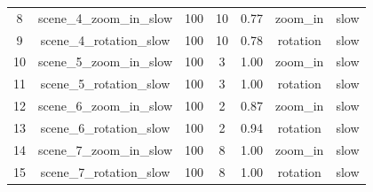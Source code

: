 \begin{table}
\begin{tabular}{|c|c|c|c|c|c|c|}
8  & scene\_4\_zoom\_in\_slow & 100                                                      & 10                                                        & 0.77                                                         & zoom\_in                                                    & slow     \\
9  & scene\_4\_rotation\_slow & 100                                                      & 10                                                        & 0.78                                                         & rotation                                                    & slow     \\
10 & scene\_5\_zoom\_in\_slow & 100                                                      & 3                                                         & 1.00                                                         & zoom\_in                                                    & slow     \\
11 & scene\_5\_rotation\_slow & 100                                                      & 3                                                         & 1.00                                                         & rotation                                                    & slow     \\
12 & scene\_6\_zoom\_in\_slow & 100                                                      & 2                                                         & 0.87                                                         & zoom\_in                                                    & slow     \\
13 & scene\_6\_rotation\_slow & 100                                                      & 2                                                         & 0.94                                                         & rotation                                                    & slow     \\
14 & scene\_7\_zoom\_in\_slow & 100                                                      & 8                                                         & 1.00                                                         & zoom\_in                                                    & slow     \\
15 & scene\_7\_rotation\_slow & 100                                                      & 8                                                         & 1.00                                                         & rotation                                                    & slow     \\

\end{tabular}
\end{table}
